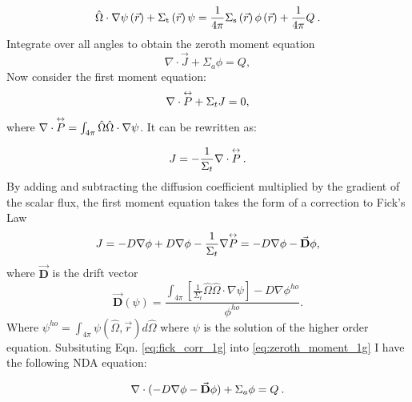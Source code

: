   \begin{equation}
  \hat{\Omega}\cdot \nabla \psi \left(\vec{r}\right)+ \Sigma_{\mathrm{t}}\left(\vec{r}\right)\psi = \frac{1}{4 \pi} \Sigma_{\mathrm{s}}\left(\vec{r}\right) \phi\left(\vec{r}\right) + \frac{1}{4 \pi} Q\:.
  \end{equation}
Integrate over all angles to obtain the zeroth moment equation
\begin{equation}

  \nabla \cdot \vec{J} + \Sigma_a\phi  =  Q,
  \label{eq:zeroth_moment_1g}
  \end{equation}
  Now consider the first moment equation:
  \begin{equation}
  \nabla \cdot \overset{\text{\scriptsize$\leftrightarrow$}}{P} + \Sigma_t J = 0,
  \end{equation}
where $\nabla \cdot \overset{\text{\scriptsize$\leftrightarrow$}}{P} =  \int_{4\pi} \hat{\Omega} \hat{\Omega} \cdot \nabla \psi$. It can be rewritten as: 

  \begin{equation}
  J= -\frac{1}{\Sigma_t} \nabla \cdot \overset{\text{\scriptsize$\leftrightarrow$}}{P}\:. 
  \end{equation}
  By adding and subtracting the diffusion coefficient multiplied by the gradient of the scalar flux, the first moment equation takes the form of a correction to Fick's Law
  \begin{equation}
  J = -D \nabla \phi + D \nabla \phi - \frac{1}{\Sigma_t} \nabla \overset{\text{\scriptsize$\leftrightarrow$}}{P} \\

  = -D \nabla \phi - \vec{\textbf{D}} \phi,

  \label{eq:fick_corr_1g}
  \end{equation}
  where $\vec{\textbf{D}}$ is the drift vector
 \begin{equation}
  \vec{\textbf{D}} (\psi) = \frac{\int_{4\pi} [\frac{1}{\Sigma_t} \hat{\Omega} \hat{\Omega}\cdot \nabla \psi] - D \nabla \phi^{ho}}{\phi^{ho}}.
  \label{eq:drift_vector}
  \end{equation} 
Where $\psi^{ho} = \int_{4\pi} \psi(\hat{\Omega}, \vec{r}) d\hat{\Omega}$ where $\psi$ is the solution of the higher order equation. Subsituting Eqn. \eqref{eq:fick_corr_1g} into \eqref{eq:zeroth_moment_1g} I have the following NDA equation:

  \begin{equation}
  \nabla\cdot(-D \nabla \phi - \vec{\bf D} \phi) + \Sigma_a \phi = Q \:. \label{eq:NDA_1g}
  \end{equation}
  
